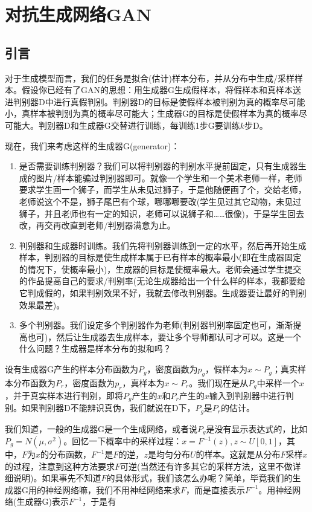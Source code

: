 % 
\section{对抗生成网络GAN}
    \subsection{引言}
        \par
        对于生成模型而言，我们的任务是拟合(估计)样本分布，并从分布中生成/采样样本。假设你已经有了GAN的思想：用生成器G生成假样本，将假样本和真样本送进判别器D中进行真假判别。判别器D的目标是使假样本被判别为真的概率尽可能小，真样本被判别为真的概率尽可能大；生成器G的目标是使假样本为真的概率尽可能大。判别器D和生成器G交替进行训练，每训练1步G要训练$k$步D。
        \par
        现在，我们来考虑这样的生成器G(generator)：
        \begin{enumerate}
        \item 是否需要训练判别器？我们可以将判别器的判别水平提前固定，只有生成器生成的图片/样本能骗过判别器即可。就像一个学生和一个美术老师一样，老师要求学生画一个狮子，而学生从未见过狮子，于是他随便画了个，交给老师，老师说这个不是，狮子尾巴有个球，哪哪哪要改(学生见过其它动物，未见过狮子，并且老师也有一定的知识，老师可以说狮子和……很像)，于是学生回去改，再交再改直到老师/判别器满意为止。
        \item 判别器和生成器时训练。我们先将判别器训练到一定的水平，然后再开始生成样本，判别器的目标是使生成样本属于已有样本的概率最小(即在生成器固定的情况下，使概率最小)，生成器的目标是使概率最大。老师会通过学生提交的作品提高自己的要求/判别率(无论生成器给出一个什么样的样本，我都要给它判成假的，如果判别效果不好，我就去修改判别器。生成器要让最好的判别效果最差)。
        \item 多个判别器。我们设定多个判别器作为老师(判别器判别率固定也可，渐渐提高也可)，然后让生成器去生成样本，要让多个导师都认可才可以。这是一个什么问题？生成器是样本分布的拟和吗？
        \end{enumerate}
        \par
        设有生成器G产生的样本分布函数为$P_g$，密度函数为$p_g$，假样本为$x\sim P_g$；真实样本分布函数为$P_r$，密度函数为$p_r$，真样本为$x\sim P_r$。我们现在是从$P_g$中采样一个$x$，并于真实样本进行判别，即将$P_g$产生的$x$和$P_r$产生的$x$输入到判别器中进行判别。如果判别器D不能辨识真伪，我们就说在D下，$P_g$是$P_r$的估计。
        \par
        我们知道，一般的生成器G是一个生成网络，或者说$P_g$是没有显示表达式的，比如$P_g = N(\mu,\sigma^2)$。回忆一下概率中的采样过程：$x = F^{-1}(z),z\sim U[0,1]$，其中，$F$为$x$的分布函数，$F^{-1}$是$F$的逆，$z$是均匀分布$U$的样本。这就是从分布$F$采样$x$的过程，注意到这种方法要求$F$可逆(当然还有许多其它的采样方法，这里不做详细说明)。如果事先不知道$F$的具体形式，我们该怎么办呢？简单，毕竟我们的生成器G用的神经网络嘛，我们不用神经网络来求$F$，而是直接表示$F^{-1}$。用神经网络(生成器G)表示$F^{-1}$，于是有
